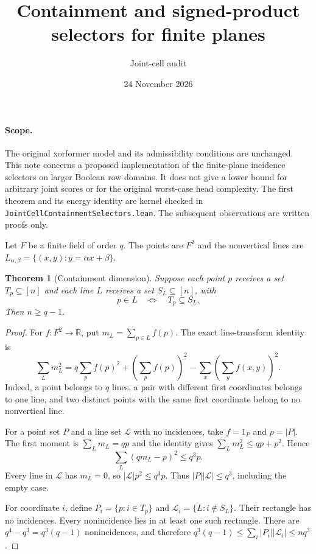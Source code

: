 \documentclass{article}
\newtheorem{theorem}{Theorem}
\begin{document}
\title{Containment and signed-product selectors for finite planes}
\author{Joint-cell audit}
\date{24 November 2026}
\maketitle

\paragraph{Scope.}
The original xorformer model and its admissibility conditions are unchanged.
This note concerns a proposed implementation of the finite-plane incidence
selectors on larger Boolean row domains.  It does not give a lower bound
for arbitrary joint scores or for the original worst-case head complexity.
The first theorem and its energy identity are kernel checked in
\texttt{JointCellContainmentSelectors.lean}.  The subsequent observations
are written proofs only.

Let $F$ be a finite field of order $q$.  The points are $F^2$ and the
nonvertical lines are $L_{\alpha,\beta}=\{(x,y):y=\alpha x+\beta\}$.

\begin{theorem}[Containment dimension]
Suppose each point $p$ receives a set $T_p\subseteq[n]$ and each line $L$
receives a set $S_L\subseteq[n]$, with
\[
p\in L\quad\Longleftrightarrow\quad T_p\subseteq S_L.
\]
Then $n\geq q-1$.
\end{theorem}
\begin{proof}
For $f:F^2\to\mathbb R$, put $m_L=\sum_{p\in L}f(p)$.
The exact line-transform identity is
\[
\sum_L m_L^2
=q\sum_p f(p)^2+\left(\sum_p f(p)\right)^2
-\sum_x\left(\sum_y f(x,y)\right)^2.
\]
Indeed, a point belongs to $q$ lines, a pair with different first
coordinates belongs to one line, and two distinct points with the same
first coordinate belong to no nonvertical line.

For a point set $P$ and a line set $\mathcal L$ with no incidences, take
$f=1_P$ and $p=|P|$.  The first moment is $\sum_Lm_L=qp$ and the
identity gives $\sum_Lm_L^2\leq qp+p^2$.  Hence
\[
\sum_L(qm_L-p)^2\leq q^3p.
\]
Every line in $\mathcal L$ has $m_L=0$, so
$|\mathcal L|p^2\leq q^3p$.  Thus $|P||\mathcal L|\leq q^3$,
including the empty case.

For coordinate $i$, define
$P_i=\{p:i\in T_p\}$ and $\mathcal L_i=\{L:i\notin S_L\}$.
Their rectangle has no incidences.  Every nonincidence lies in at least
one such rectangle.  There are $q^4-q^3=q^3(q-1)$ nonincidences, and
therefore $q^3(q-1)\leq\sum_i|P_i||\mathcal L_i|\leq nq^3$.
\end{proof}
\end{document}
